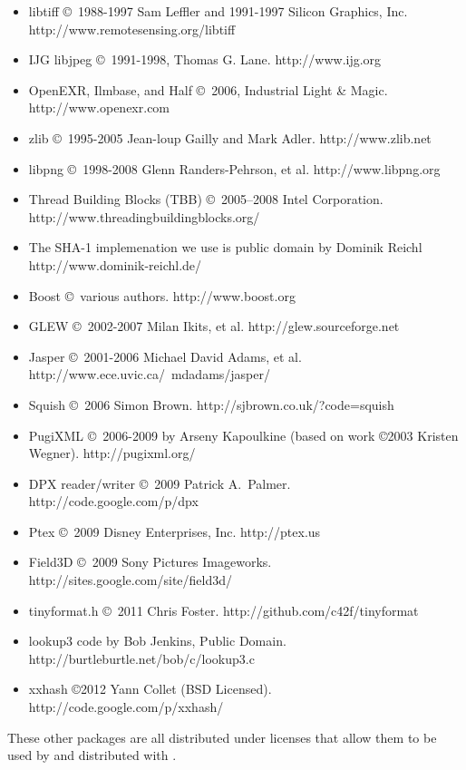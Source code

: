 \begin{itemize}
\item {\cf libtiff} \copyright\ 1988-1997 Sam Leffler and 1991-1997 Silicon
Graphics, Inc. \\ {\cf http://www.remotesensing.org/libtiff}
\item {\cf IJG libjpeg} \copyright\ 1991-1998, Thomas G. Lane.  {\cf http://www.ijg.org}
\item OpenEXR, Ilmbase, and Half \copyright\ 2006, Industrial Light \& Magic.\\
{\cf http://www.openexr.com}
\item {\cf zlib} \copyright\ 1995-2005 Jean-loup Gailly and Mark Adler. 
{\cf http://www.zlib.net}
\item {\cf libpng} \copyright\ 1998-2008 Glenn Randers-Pehrson, et al.  
{\cf http://www.libpng.org}
\item Thread Building Blocks (TBB) \copyright\ 2005--2008 Intel Corporation.\\
{\cf http://www.threadingbuildingblocks.org/}
\item The SHA-1 implemenation we use is public domain by
Dominik Reichl \\ {\cf http://www.dominik-reichl.de/}
\item Boost \copyright\ various authors. {\cf http://www.boost.org}
\item GLEW \copyright\ 2002-2007 Milan Ikits, et al. 
{\cf http://glew.sourceforge.net}
\item Jasper \copyright\ 2001-2006 Michael David Adams, et al. \\
{\cf http://www.ece.uvic.ca/~mdadams/jasper/}
\item Squish \copyright\ 2006 Simon Brown.
{\cf http://sjbrown.co.uk/?code=squish}
\item PugiXML \copyright\ 2006-2009 by Arseny Kapoulkine (based on work
\copyright 2003 Kristen Wegner). {\cf http://pugixml.org/}
\item DPX reader/writer \copyright\ 2009 Patrick A.\ Palmer.
{\cf http://code.google.com/p/dpx}
\item Ptex \copyright\ 2009 Disney Enterprises, Inc.
{\cf http://ptex.us}
\item Field3D \copyright\ 2009 Sony Pictures Imageworks.
{\cf http://sites.google.com/site/field3d/}
\item {\cf tinyformat.h} \copyright\ 2011 Chris Foster.
{\cf http://github.com/c42f/tinyformat}
\item {\cf lookup3} code by Bob Jenkins, Public Domain.
{\cf http://burtleburtle.net/bob/c/lookup3.c}
\item {\cf xxhash} \copyright 2012 Yann Collet (BSD Licensed). 
{\cf http://code.google.com/p/xxhash/}
\end{itemize}

These other packages are all distributed under licenses that allow them
to be used by and distributed with \product.

\chapwidthend
